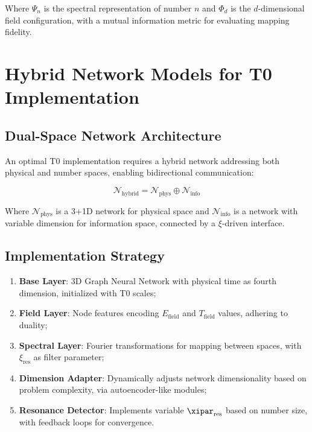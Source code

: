 	Where $\Psi_n$ is the spectral representation of number $n$ and $\Phi_d$ is the $d$-dimensional field configuration, with a mutual information metric for evaluating mapping fidelity.
	
	\section{Hybrid Network Models for T0 Implementation}
	\label{sec:hybrid_models}
	
	\subsection{Dual-Space Network Architecture}
	\label{subsec:dual_space}
	
	An optimal T0 implementation requires a hybrid network addressing both physical and number spaces, enabling bidirectional communication:
	
	\begin{equation}
		\mathcal{N}_{\text{hybrid}} = \mathcal{N}_{\text{phys}} \oplus \mathcal{N}_{\text{info}}
	\end{equation}
	
	Where $\mathcal{N}_{\text{phys}}$ is a 3+1D network for physical space and $\mathcal{N}_{\text{info}}$ is a network with variable dimension for information space, connected by a $\xi$-driven interface.
	
	\subsection{Implementation Strategy}
	\label{subsec:implementation_strategy}
	
\begin{tcolorbox}[colback=green!5!white,colframe=green!75!black,title={Optimal T0 Network Implementation Strategy},width=\textwidth]
	\begin{enumerate}
		\item \textbf{Base Layer}: 3D Graph Neural Network with physical time as fourth dimension, initialized with T0 scales;
		\item \textbf{Field Layer}: Node features encoding $E_{\text{field}}$ and $T_{\text{field}}$ values, adhering to duality;
		\item \textbf{Spectral Layer}: Fourier transformations for mapping between spaces, with $\xi_{\text{res}}$ as filter parameter;
		\item \textbf{Dimension Adapter}: Dynamically adjusts network dimensionality based on problem complexity, via autoencoder-like modules;
		\item \textbf{Resonance Detector}: Implements variable $\xipar_{\text{res}}$ based on number size, with feedback loops for convergence.
	\end{enumerate}
\end{tcolorbox}
	
